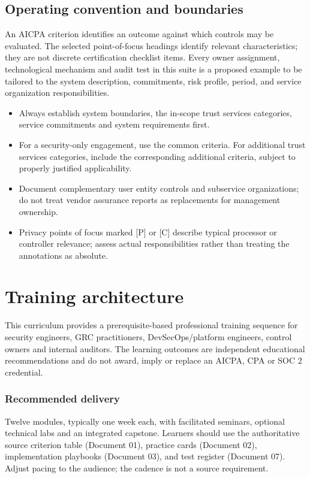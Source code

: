 \documentclass[10pt,oneside]{report}
\begin{document}
\section*{Operating convention and boundaries}
An AICPA criterion identifies an outcome against which controls may be evaluated. The selected point-of-focus headings identify relevant characteristics; they are not discrete certification checklist items. Every owner assignment, technological mechanism and audit test in this suite is a proposed example to be tailored to the system description, commitments, risk profile, period, and service organization responsibilities.

\begin{itemize}
\item Always establish system boundaries, the in-scope trust services categories, service commitments and system requirements first.
\item For a security-only engagement, use the common criteria. For additional trust services categories, include the corresponding additional criteria, subject to properly justified applicability.
\item Document complementary user entity controls and subservice organizations; do not treat vendor assurance reports as replacements for management ownership.
\item Privacy points of focus marked [P] or [C] describe typical processor or controller relevance; assess actual responsibilities rather than treating the annotations as absolute.
\end{itemize}

\chapter{Training architecture}
This curriculum provides a prerequisite-based professional training sequence for security engineers, GRC practitioners, DevSecOps/platform engineers, control owners and internal auditors. The learning outcomes are independent educational recommendations and do not award, imply or replace an AICPA, CPA or SOC 2 credential.

\subsection{Recommended delivery}
Twelve modules, typically one week each, with facilitated seminars, optional technical labs and an integrated capstone. Learners should use the authoritative source criterion table (Document 01), practice cards (Document 02), implementation playbooks (Document 03), and test register (Document 07). Adjust pacing to the audience; the cadence is not a source requirement.
\end{document}

